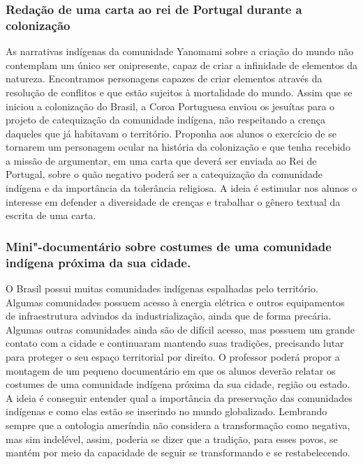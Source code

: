\documentclass[12pt]{extarticle}
\begin{document}
{\subsubsection{Redação de uma carta ao rei de Portugal durante a colonização}


  As narrativas indígenas da comunidade Yanomami sobre a criação do
  mundo não contemplam um único ser onipresente, capaz de criar a
  infinidade de elementos da natureza. Encontramos personagens capazes
  de criar elementos através da resolução de conflitos e que estão sujeitos
  à mortalidade do mundo. Assim que se iniciou a colonização do Brasil,
  a Coroa Portuguesa enviou os jesuítas para o projeto de catequização
  da comunidade indígena, não respeitando a crença daqueles que já
  habitavam o território. Proponha aos alunos o exercício de se tornarem
  um personagem ocular na história da colonização e que tenha recebido a
  missão de argumentar, em uma carta que deverá ser enviada ao Rei de
  Portugal, sobre o quão negativo poderá ser a catequização da
  comunidade indígena e da importância da tolerância religiosa. A ideia
  é estimular nos alunos o interesse em defender a diversidade de crenças
  e trabalhar o gênero textual da escrita de uma carta.


\subsubsection{Mini"-documentário sobre costumes de uma comunidade indígena próxima da sua cidade.}


  O Brasil possui muitas comunidades indígenas espalhadas pelo
  território. Algumas comunidades possuem acesso à energia elétrica e
  outros equipamentos de infraestrutura advindos da industrialização, ainda que de forma
  precária. Algumas outras comunidades ainda são de difícil acesso, mas
  possuem um grande contato com a cidade e continuaram mantendo suas
  tradições, precisando lutar para proteger o seu espaço territorial por
  direito. O professor poderá propor a montagem de um pequeno
  documentário em que os alunos deverão relatar os costumes de uma
  comunidade indígena próxima da sua cidade, região ou estado. A ideia é
  conseguir entender qual a importância da preservação das comunidades
  indígenas e como elas estão se inserindo no mundo globalizado. Lembrando sempre que 
  a ontologia ameríndia não considera a transformação como negativa, mas sim indelével, assim, 
  poderia se dizer que a tradição, para esses povos, se mantém por meio da capacidade de seguir
  se transformando e se restabelecendo.

}
\end{document}
